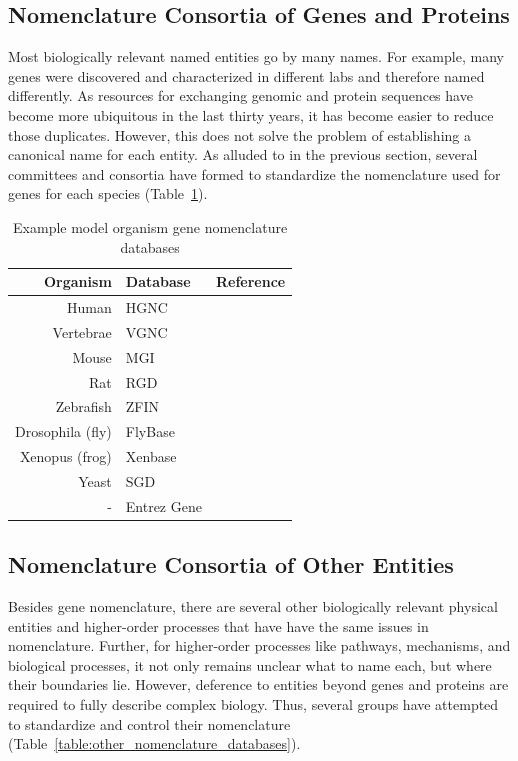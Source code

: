 \subsection{Nomenclature Consortia of Genes and Proteins}

Most biologically relevant named entities go by many names.
For example, many genes were discovered and characterized in different labs and therefore named differently.
As resources for exchanging genomic and protein sequences have become more ubiquitous in the last thirty years, it has become easier to reduce those duplicates.
However, this does not solve the problem of establishing a canonical name for each entity.
As alluded to in the previous section, several committees and consortia have formed to standardize the nomenclature used for genes for each species (Table~\ref{table:gene_nomenclature_databases}).

\begin{table}
    \centering
    \begin{tabular}{ r l l }
        Organism & Database & Reference \\
        \hline
        Human & \ac{HGNC} &\cite{Yates2017} \\
        Vertebrae & VGNC &\cite{Yates2017} \\
        Mouse & MGI &\cite{Blake2017} \\
        Rat & RGD &\cite{Shimoyama2015} \\
        Zebrafish & ZFIN &\cite{Howe2013}  \\
        Drosophila (fly) & FlyBase &\cite{Thurmond2019}\\
        Xenopus (frog) & Xenbase &\cite{Karimi2018}  \\
        Yeast & SGD &\cite{Cherry2012} \\
        - & Entrez Gene &\cite{Maglott2011}  \\
    \end{tabular}
    \caption{Example model organism gene nomenclature databases}
    \label{table:gene_nomenclature_databases}
\end{table}

\subsection{Nomenclature Consortia of Other Entities}

Besides gene nomenclature, there are several other biologically relevant physical entities and higher-order processes that have have the same issues in nomenclature.
Further, for higher-order processes like pathways, mechanisms, and biological processes, it not only remains unclear what to name each, but where their boundaries lie.
However, deference to entities beyond genes and proteins are required to fully describe complex biology.
Thus, several groups have attempted to standardize and control their nomenclature (Table~\ref{table:other_nomenclature_databases}).

